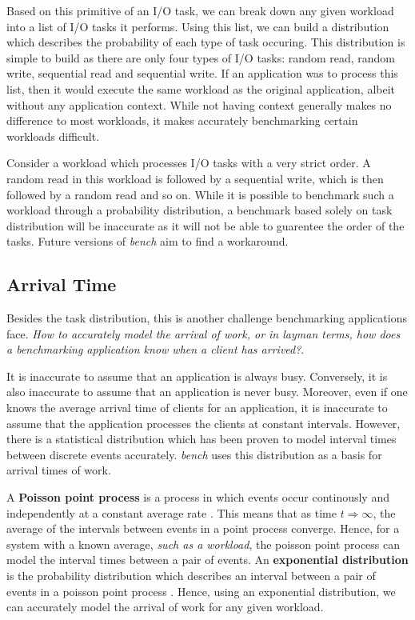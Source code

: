 \documentclass[10pt, author, twocolumn]{article}
\begin{document}
Based on this primitive of an I/O task, we can break down any given workload into a list of I/O tasks it performs. Using this list, we can build a distribution which describes the probability of each type of task occuring. This distribution is simple to build as there are only four types of I/O tasks: random read, random write, sequential read and sequential write. If an application was to process this list, then it would execute the same workload as the original application, albeit without any application context. While not having context generally makes no difference to most workloads, it makes accurately benchmarking certain workloads difficult.

Consider a workload which processes I/O tasks with a very strict order. A random read in this workload is followed by a sequential write, which is then followed by a random read and so on. While it is possible to benchmark such a workload through a probability distribution, a benchmark based solely on task distribution will be inaccurate as it will not be able to guarentee the order of the tasks. Future versions of \textit{bench} aim to find a workaround.

\subsection{Arrival Time}
Besides the task distribution, this is another challenge benchmarking applications face. \textit{How to accurately model the arrival of work, or in layman terms, how does a benchmarking application know when a client has arrived?}. 

It is inaccurate to assume that an application is always busy. Conversely, it is also inaccurate to assume that an application is never busy. Moreover, even if one knows the average arrival time of clients for an application, it is inaccurate to assume that the application processes the clients at constant intervals. However, there is a statistical distribution which has been proven to model interval times between discrete events accurately. \textit{bench} uses this distribution as a basis for arrival times of work. 

A \textbf{Poisson point process} is a process in which events occur continously and independently at a constant average rate \cite{kingman1993poisson}. This means that as time $t \Rightarrow \infty$, the average of the intervals between events in a point process converge. Hence, for a system with a known average, \textit{such as a workload}, the poisson point process can model the interval times between a pair of events. An \textbf{exponential distribution} is the probability distribution which describes an interval between a pair of events in a poisson point process \cite{buzen1973computational}. Hence, using an exponential distribution, we can accurately model the arrival of work for any given workload.
\end{document}

